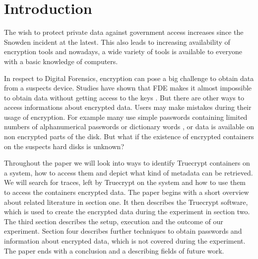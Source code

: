 \section{Introduction}
The wish to protect private data against government access increases since the Snowden incident at the latest. 
This also leads to increasing availability of encryption tools and nowadays, a wide variety of tools is available to everyone with a basic knowledge of computers.

In respect to Digital Forensics, encryption can pose a big challenge to obtain data from a suspects device. 
Studies have shown that \gls{FDE} makes it almost impossible to obtain data without getting access to the keys \cite{Casey2011129}. 
But there are other ways to access informations about encrypted data.
Users may make mistakes during their usage of encryption. 
For example many use simple passwords containing limited numbers of alphanumerical passwords or dictionary words \cite{worstpractise}, or data is available on non encrypted parts of the disk. 
But what if the existence of encrypted containers on the suspects hard disks is unknown?

Throughout the paper we will look into ways to identify Truecrypt containers on a system, how to access them and depict what kind of metadata can be retrieved.
We will search for traces, left by Truecrypt on the system and how to use them to access the containers encrypted data.
The paper begins with a short overview about related literature in section one. 
It then describes the Truecrypt software, which is used to create the encrypted data during the experiment in section two. 
The third section describes the setup, execution and the outcome of our experiment. 
Section four describes further techniques to obtain passwords and information about encrypted data, which is not covered during the experiment. 
The paper ends with a conclusion and a describing fields of future work.
